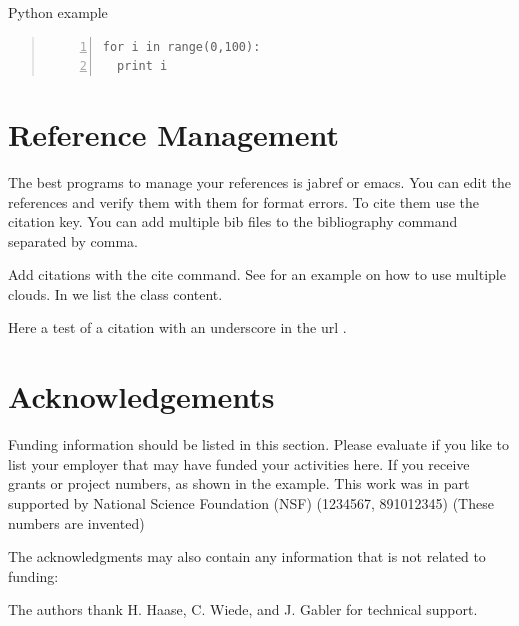 \documentclass[9pt,twocolumn,twoside]{styles/osajnl}
\begin{document}
\begin{algorithm}
\caption{Python example}\label{alg:python}
\begin{quote}
\begin{Verbatim}[numbers=left]
for i in range(0,100):
  print i
\end{Verbatim}
\end{quote}
\end{algorithm}

\section{Reference Management}

The best programs to manage your references is jabref or emacs. You
can edit the references and verify them with them for format
errors. To cite them use the citation key. You can add multiple bib
files to the bibliography command separated by comma.

\noindent Add citations with the cite command. See
\cite{las14cloudmeshmultiple} for an example on how to use multiple
clouds. In \cite{www-i524} we list the class content.

Here a test of a citation with an underscore in the url \cite{www-underscore}.

\section*{Acknowledgements}

Funding information should be listed in this section. Please evaluate
if you like to list your employer that may have funded your activities
here.  If you receive grants or project numbers, as shown in the
example.  This work was in part supported by National Science
Foundation (NSF) (1234567, 891012345) (These numbers are invented)

The acknowledgments may also contain any information that is not
related to funding:

The authors thank H. Haase, C. Wiede, and J. Gabler for technical
support.




 
\end{document}
